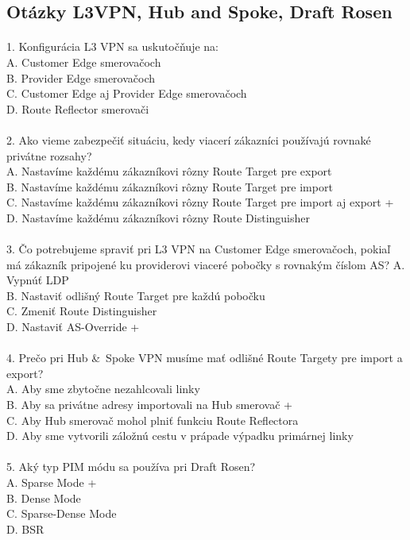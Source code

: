 \documentclass[12pt,twoside,a4paper]{report}
\begin{document}
\subsection{Otázky L3VPN, Hub and Spoke, Draft Rosen}
\paragraph{}
1. Konfigurácia L3 VPN sa uskutočňuje na:\\
A. Customer Edge smerovačoch\\
B. Provider Edge smerovačoch\\
C. Customer Edge aj Provider Edge smerovačoch\\
D. Route Reflector smerovači\\

\paragraph{}
2. Ako vieme zabezpečiť situáciu, kedy viacerí zákazníci používajú rovnaké privátne rozsahy?\\
A. Nastavíme každému zákazníkovi rôzny Route Target pre export\\
B. Nastavíme každému zákazníkovi rôzny Route Target pre import\\
C. Nastavíme každému zákazníkovi rôzny Route Target pre import aj export +\\
D. Nastavíme každému zákazníkovi rôzny Route Distinguisher\\

\paragraph{}
3. Čo potrebujeme spraviť pri L3 VPN na Customer Edge smerovačoch, pokiaľ má zákazník pripojené ku providerovi viaceré pobočky s rovnakým číslom AS?
A. Vypnúť LDP\\
B. Nastaviť odlišný Route Target pre každú pobočku\\
C. Zmeniť Route Distinguisher\\
D. Nastaviť AS-Override +\\

\paragraph{}
4. Prečo pri Hub \& Spoke VPN musíme mať odlišné Route Targety pre import a export?\\
A. Aby sme zbytočne nezahlcovali linky\\
B. Aby sa privátne adresy importovali na Hub smerovač +\\
C. Aby Hub smerovač mohol plniť funkciu Route Reflectora\\
D. Aby sme vytvorili záložnú cestu v prápade výpadku primárnej linky\\

\paragraph{}
5. Aký typ PIM módu sa používa pri Draft Rosen?\\
A. Sparse Mode +\\
B. Dense Mode\\
C. Sparse-Dense Mode\\
D. BSR\\
\end{document}
